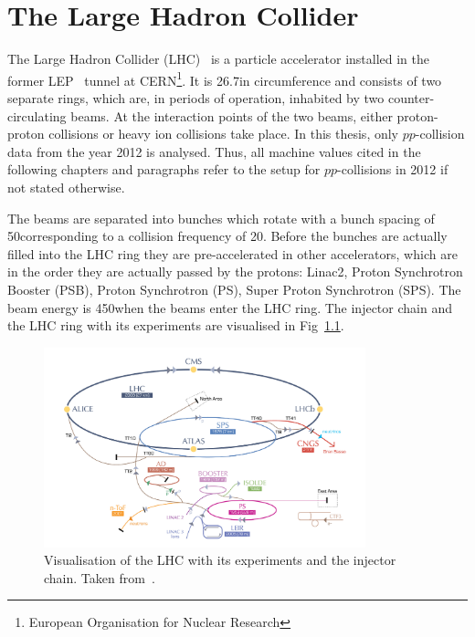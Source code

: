 \chapter{The Large Hadron Collider}

The Large Hadron Collider (LHC)~\cite{bib:LHC_machine_2008,bib:LHC_2004} is a particle accelerator installed in the former LEP~\cite{bib:LEP_design_1984} tunnel at CERN\footnote{European Organisation for Nuclear Research}.
It is 26.7\km in circumference and consists of two separate rings, which are, in periods of operation, inhabited by two counter-circulating beams.
At the interaction points of the two beams, either proton-proton collisions or heavy ion collisions take place.
In this thesis, only $pp$-collision data from the year 2012 is analysed.
Thus, all machine values cited in the following chapters and paragraphs refer to the setup for $pp$-collisions in 2012 if not stated otherwise.

The beams are separated into bunches which rotate with a bunch spacing of 50\ns corresponding to a collision frequency of 20\mhz.
Before the bunches are actually filled into the LHC ring they are pre-accelerated in other accelerators, which are in the order they are actually passed by the protons: Linac2, Proton  Synchrotron Booster (PSB), Proton Synchrotron (PS), Super Proton Synchrotron (SPS).
The beam energy is 450\gev when the beams enter the LHC ring.
The injector chain and the LHC ring with its experiments are visualised in Fig~\ref{fig:LHC}.
\begin{figure}[!b]
  \centering
      \includegraphics[width=0.83\textwidth]{figures/experiment/LHC/LHC_small.png}
  \caption{Visualisation of the LHC with its experiments and the injector chain. Taken from~\cite{bib:CERNBrochure}.}  
  \label{fig:LHC}
\end{figure}

